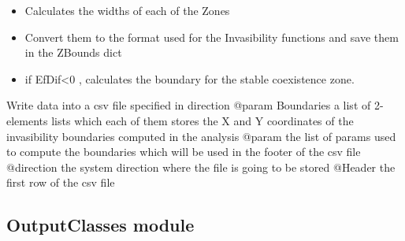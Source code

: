\documentclass[letterpaper,10pt,english]{sphinxmanual}
\begin{document}
\begin{fulllineitems}
\begin{fulllineitems}
\begin{itemize}
\item {} 
Calculates the widths of each of the Zones

\item {} 
Convert them to the format used for the Invasibility functions and save them in the ZBounds dict

\item {} 
if EfDif\textless{}0 , calculates the boundary for the stable coexistence zone.

\end{itemize}

\end{fulllineitems}


\begin{fulllineitems}
\label{Analisis/InvasionAnalysis:InvasionAnalysis.InvBoundaries.writeInvasibilityValues}
Write data into a csv file specified in direction
@param Boundaries a list of 2-elements lists which each of them stores the X and Y coordinates
of the invasibility boundaries computed in the analysis
@param the list of params used to compute the boundaries which will be used in the footer of the csv file
@direction the system direction where the file is going to be stored
@Header the first row of the csv file

\end{fulllineitems}


\end{fulllineitems}



\subsection{OutputClasses module}
\label{Analisis/OutputClasses:module-OutputClasses}\label{Analisis/OutputClasses::doc}\label{Analisis/OutputClasses:outputclasses-module}
\end{document}
